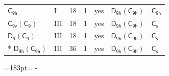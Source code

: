 \documentclass[10pt,a4paper]{article}
\newcommand{\needspace}[1]{\par\penalty-100\begingroup\dimen0=#1\relax\dimen2=\pagegoal
  \advance\dimen2-\pagetotal\ifdim\dimen0>\dimen2\relax\ifdim\dimen2>0pt\vfil\break\fi\fi
  \endgroup}
\numberwithin{equation}{section}
\newcommand{\grp}[1]{\mathsf{#1}}
\begin{document}
{\begin{longtable}{@{}llrrlll@{}}
\href{../../../rotation/data/pdf/C9h.pdf}{$\grp{C_{9h}}$} & I & 18 & 1 & yes & \href{D9h-C9h.pdf}{$\grp{D_{9h}}(\grp{C_{9h}})$} & \href{../../../rotation/data/pdf/C9h.pdf}{$\grp{C_{9h}}$}\\
\href{C9v-C9.pdf}{$\grp{C_{9v}}(\grp{C_{9}})$} & III & 18 & 1 & yes & \href{D9h-C9h.pdf}{$\grp{D_{9h}}(\grp{C_{9h}})$} & \href{../../../rotation/data/pdf/C1v.pdf}{$\grp{C_{s}}$}\\
\href{D9-C9.pdf}{$\grp{D_{9}}(\grp{C_{9}})$} & III & 18 & 1 & yes & \href{D9h-C9h.pdf}{$\grp{D_{9h}}(\grp{C_{9h}})$} & \href{../../../rotation/data/pdf/C1v.pdf}{$\grp{C_{s}}$}\\*
\href{D9h-C9h.pdf}{$\grp{D_{9h}}(\grp{C_{9h}})$} & III & 36 & 1 & yes & \href{D9h-C9h.pdf}{$\grp{D_{9h}}(\grp{C_{9h}})$} & \href{../../../rotation/data/pdf/C1v.pdf}{$\grp{C_{s}}$}\\
\bottomrule\end{longtable}}
\needspace{183pt}
\end{document}
